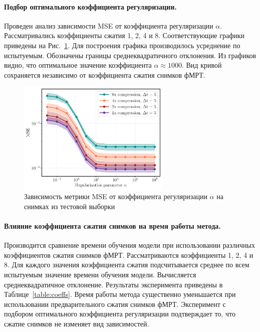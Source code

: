 \paragraph*{Подбор оптимального коэффициента регуляризации.}

Проведен анализ зависимости MSE от коэффициента регуляризации $\alpha$.
Рассматривались коэффициенты сжатия 1, 2, 4 и 8.
Соответствующие графики приведены на Рис.~\ref{fig:mse-alpha}.
Для построения графика производилось усреднение по испытуемым.
Обозначены границы среднеквадратичного отклонения.
Из графиков видно, что оптимальное значение коэффициента $\alpha \approx 1000$.
Вид кривой сохраняется независимо от коэффициента сжатия снимков фМРТ.

\begin{figure}[h!]
	\centering
	\includegraphics[width=0.65\textwidth]{images/fmri_forecasting/subs_MSE_alpha.pdf}
	\caption{Зависимость метрики MSE от коэффициента регуляризации $\alpha$ на снимках из тестовой выборки}
	\label{fig:mse-alpha}
\end{figure}

\paragraph*{Влияние коэффициента сжатия снимков на время работы метода.}

Производится сравнение времени обучения модели при использовании различных
коэффициентов сжатия снимков фМРТ. Рассматриваются коэффициенты 1, 2, 4 и 8.
Для каждого значения коэффициента сжатия подсчитывается среднее по всем испытуемым
значение времени обучения модели. Вычисляется среднеквадратичное отклонение.
Результаты эксперимента приведены в Таблице~\ref{table:coeffs}.
Время работы метода существенно уменьшается при использовании
предварительного сжатия снимков фМРТ. 
Эксперимент с подбором оптимального коэффициента регуляризации
подтверждает то, что сжатие снимков не изменяет вид зависимостей.

